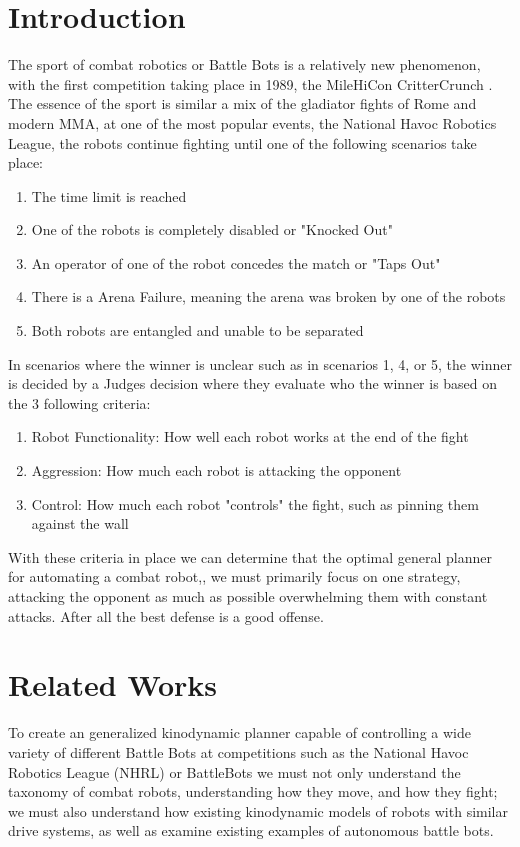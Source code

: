 \documentclass[conference]{IEEEtran}
\begin{document}
\section{Introduction}
The sport of combat robotics or Battle Bots is a relatively new phenomenon, with the first competition taking place in 1989, the MileHiCon CritterCrunch \cite{b1}.  The essence of the sport is similar a mix of the gladiator fights of Rome and modern MMA, at one of the most popular events, the National Havoc Robotics League, the robots continue fighting until one of the following scenarios take place:
\begin{enumerate}
\item{The time limit is reached \cite{b2}}
\item{One of the robots is completely disabled or "Knocked Out" \cite{b2}}
\item{An operator of one of the robot concedes the match or "Taps Out" \cite{b2}}
\item{There is a Arena Failure, meaning the arena was broken by one of the robots \cite{b2}}
\item{Both robots are entangled and unable to be separated \cite{b2}}
\end{enumerate} 
In scenarios where the winner is unclear such as in scenarios 1, 4, or 5, the winner is decided by a Judges decision where they evaluate who the winner is based on the 3 following criteria:
\begin{enumerate}
\item{Robot Functionality: How well each robot works at the end of the fight \cite{b2}}
\item{Aggression: How much each robot is attacking the opponent \cite{b2}}
\item{Control: How much each robot "controls" the fight, such as pinning them against the wall \cite{b2}}
\end{enumerate}
With these criteria in place we can determine that the optimal general planner for automating a combat robot,, we must primarily focus on one strategy, attacking the opponent as much as possible overwhelming them with constant attacks.  After all the best defense is a good offense.

\section{Related Works}

To create an generalized kinodynamic planner capable of controlling a wide variety of different Battle Bots at competitions such as the National Havoc Robotics League (NHRL) or BattleBots we must not only understand the taxonomy of combat robots, understanding how they move, and how they fight; we must also understand how existing kinodynamic models of robots with similar drive systems, as well as examine existing examples of autonomous battle bots.
\end{document}
